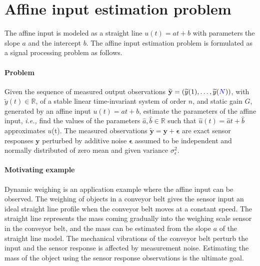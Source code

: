 \section{Affine input estimation problem}

The affine input is modeled as a straight line $u(t) = {a} t + {b}$ with parameters the slope $a$ and the intercept $b$.
The affine input estimation problem is formulated as a signal processing problem as follows. 

\paragraph{Problem} 
Given the sequence of measured output observations $\widetilde{\mathbf{y}} = \left( \widetilde{y}(1),\ldots, \widetilde{y}(\color{blue}N\color{black})\right)$, with $\widetilde{y}(t) \in \mathbb{R}$, of a stable linear time-invariant system of order $n$, and static gain ${G}$, generated by an affine input $u(t) = {a} t + {b}$, estimate the parameters of the affine input, \textit{i.e.,} find the values of the parameters $\widehat{a}, \widehat{b} \in \mathbb{R}$ such that $\widehat{u}(t) = \widehat{a} t + \widehat{b}$ approximates $u$(t).
The measured observations $\widetilde{\mathbf{y}} = {\mathbf{y}} + \bm{\epsilon}$ are exact sensor responses ${\mathbf{y}}$ perturbed by additive noise  $\bm{\epsilon}$ assumed to be independent and normally distributed of zero mean and given variance $\sigma_{\epsilon}^2$.

\paragraph{Motivating example}
Dynamic weighing is an application example where the affine input can be observed.
The weighing of objects in a conveyor belt gives the sensor input an ideal straight line profile when the conveyor belt moves at a constant speed.
The straight line represents the mass coming gradually into the weighing scale sensor in the conveyor belt, and
the mass can be estimated from the slope $a$ of the straight line model. 
The mechanical vibrations of the conveyor belt perturb the input and the sensor response is affected by measurement noise.
Estimating the mass of the object using the sensor response observations is the ultimate goal.


